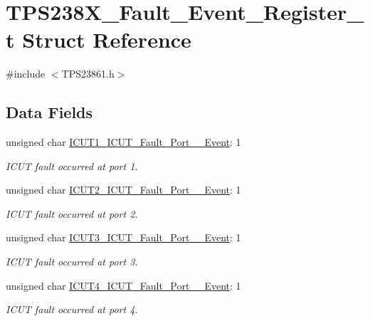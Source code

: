 \hypertarget{struct_t_p_s238_x___fault___event___register__t}{\section{T\-P\-S238\-X\-\_\-\-Fault\-\_\-\-Event\-\_\-\-Register\-\_\-t Struct Reference}
\label{struct_t_p_s238_x___fault___event___register__t}
}


{\ttfamily \#include $<$T\-P\-S23861.\-h$>$}

\subsection*{Data Fields}
\begin{DoxyCompactItemize}
\item 
unsigned char \hyperlink{struct_t_p_s238_x___fault___event___register__t_aba1ff937ba93983e7ecf680f0bb70b46}{I\-C\-U\-T1\-\_\-\-I\-C\-U\-T\-\_\-\-Fault\-\_\-\-Port\-\_\-\_\-\-Event}\-: 1
\begin{DoxyCompactList}\small\item\em I\-C\-U\-T fault occurred at port 1. \end{DoxyCompactList}\item 
unsigned char \hyperlink{struct_t_p_s238_x___fault___event___register__t_ac3f16b01de8ce8e37e550e8ec6c62549}{I\-C\-U\-T2\-\_\-\-I\-C\-U\-T\-\_\-\-Fault\-\_\-\-Port\-\_\-\_\-\-Event}\-: 1
\begin{DoxyCompactList}\small\item\em I\-C\-U\-T fault occurred at port 2. \end{DoxyCompactList}\item 
unsigned char \hyperlink{struct_t_p_s238_x___fault___event___register__t_a02f507883a5092e15ae1b75907509b5f}{I\-C\-U\-T3\-\_\-\-I\-C\-U\-T\-\_\-\-Fault\-\_\-\-Port\-\_\-\_\-\-Event}\-: 1
\begin{DoxyCompactList}\small\item\em I\-C\-U\-T fault occurred at port 3. \end{DoxyCompactList}\item 
unsigned char \hyperlink{struct_t_p_s238_x___fault___event___register__t_a843e81075894c326ce51aad8dea1e49d}{I\-C\-U\-T4\-\_\-\-I\-C\-U\-T\-\_\-\-Fault\-\_\-\-Port\-\_\-\_\-\-Event}\-: 1
\begin{DoxyCompactList}\small\item\em I\-C\-U\-T fault occurred at port 4. \end{DoxyCompactList}\item 

\end{DoxyCompactItemize}
